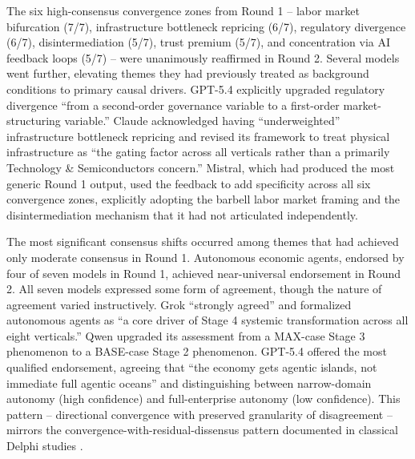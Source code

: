 \documentclass[preprint,review,12pt]{elsarticle}
\begin{document}
The six high-consensus convergence zones from Round 1 -- labor market bifurcation (7/7), infrastructure bottleneck repricing (6/7), regulatory divergence (6/7), disintermediation (5/7), trust premium (5/7), and concentration via AI feedback loops (5/7) -- were unanimously reaffirmed in Round 2. Several models went further, elevating themes they had previously treated as background conditions to primary causal drivers. GPT-5.4 explicitly upgraded regulatory divergence ``from a second-order governance variable to a first-order market-structuring variable.'' Claude acknowledged having ``underweighted'' infrastructure bottleneck repricing and revised its framework to treat physical infrastructure as ``the gating factor across all verticals rather than a primarily Technology \& Semiconductors concern.'' Mistral, which had produced the most generic Round 1 output, used the feedback to add specificity across all six convergence zones, explicitly adopting the barbell labor market framing and the disintermediation mechanism that it had not articulated independently.

The most significant consensus shifts occurred among themes that had achieved only moderate consensus in Round 1. Autonomous economic agents, endorsed by four of seven models in Round 1, achieved near-universal endorsement in Round 2. All seven models expressed some form of agreement, though the nature of agreement varied instructively. Grok ``strongly agreed'' and formalized autonomous agents as ``a core driver of Stage 4 systemic transformation across all eight verticals.'' Qwen upgraded its assessment from a MAX-case Stage 3 phenomenon to a BASE-case Stage 2 phenomenon. GPT-5.4 offered the most qualified endorsement, agreeing that ``the economy gets agentic islands, not immediate full agentic oceans'' and distinguishing between narrow-domain autonomy (high confidence) and full-enterprise autonomy (low confidence). This pattern -- directional convergence with preserved granularity of disagreement -- mirrors the convergence-with-residual-dissensus pattern documented in classical Delphi studies \citep{vondergracht2012delphi}.
\end{document}
